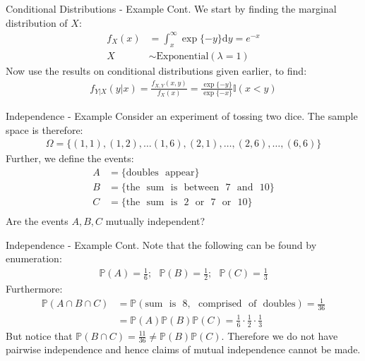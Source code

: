 \documentclass{beamer}
\begin{document}
\begin{frame}{Conditional Distributions - Example Cont.}
We start by finding the marginal distribution of $X$:
\begin{align*}
f_{X}(x) &= \int_{x}^{\infty} \exp\{ -y \}\mathrm{d}y = e^{-x} \\
X&\sim\mathrm{Exponential}(\lambda = 1)
\end{align*}
Now use the results on conditional distributions given earlier, to find:
\begin{align*}
f_{Y|X}(y|x) =  \frac{f_{X, Y}(x, y)}{f_{X}(x)} = \frac{\exp\{ -y\}}{\exp{\{ -x\}}} \mathbb{I}(x<y)
\end{align*}
\end{frame}


\begin{frame}{Independence - Example}
Consider an experiment of tossing two dice. The sample space is therefore:
\begin{align*}
\Omega = \{(1,1), (1,2),  \ldots (1,6), (2,1), \ldots, (2, 6), \ldots, (6,6)
\}
\end{align*}
Further, we define the events:
\begin{align*}
A &= \{\mathrm{doubles \>\>\> appear}\} \\
B &= \{\mathrm{the \>\>\> sum \>\>\> is \>\>\> between \>\>\> 7 \>\>\> and \>\>\> 10}\} \\
C &= \{\mathrm{the \>\>\> sum \>\>\> is \>\>\> 2 \>\>\> or \>\>\> 7 \>\>\> or \>\>\> 10}\} \\
\end{align*}
Are the events $A, B, C$ mutually independent?
\end{frame}

\begin{frame}{Independence - Example Cont.}
Note that the following can be found by enumeration:
\begin{align*}
\mathbb{P}(A) = \frac{1}{6}; \>\>\> \mathbb{P}(B) = \frac{1}{2}; \>\>\> \mathbb{P}(C) = \frac{1}{3}
\end{align*}
Furthermore:
\begin{align*}
\mathbb{P}(A\cap B\cap C ) &= \mathbb{P}(\mathrm{sum \>\>\> is \>\>\> 8, \>\>\> comprised \>\>\> of \>\>\> doubles }) = \frac{1}{36} \\
&= \mathbb{P}(A)\mathbb{P}(B)\mathbb{P}(C) = \frac{1}{6}\cdot \frac{1}{2} \cdot \frac{1}{3}
\end{align*}
But  notice that $\mathbb{P}(B \cap C) = \frac{11}{36} \neq \mathbb{P}(B)\mathbb{P}(C)$. Therefore we do not have pairwise independence and hence claims of mutual independence cannot be made. 
\end{frame}
\end{document}
